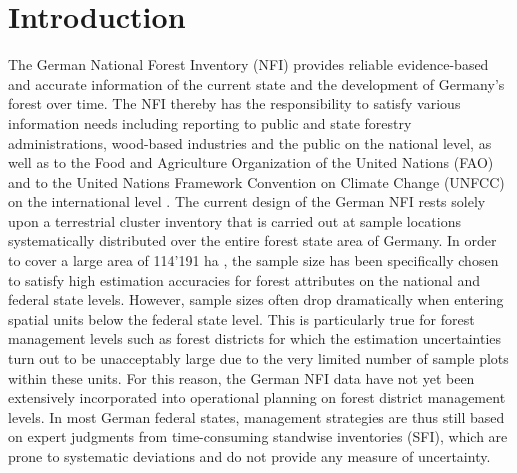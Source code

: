 
\section{Introduction} %
\label{sec:intro}

The German National Forest Inventory (NFI) provides reliable evidence-based and accurate information of the current state and the development of Germany's forest over time. The NFI thereby has the responsibility to satisfy various information needs including reporting to public and state forestry administrations, wood-based industries and the public on the national level, as well as to the Food and Agriculture Organization of the United Nations (FAO) and to the United Nations Framework Convention on Climate Change (UNFCC) on the international level \citep{polley2010intomppo}. The current design of the German NFI rests solely upon a terrestrial cluster inventory that is carried out at sample locations systematically distributed over the entire forest state area of Germany. In order to cover a large area of 114'191 ha \citep{bwi3}, the sample size has been specifically chosen to satisfy high estimation accuracies for forest attributes on the national and federal state levels. However, sample sizes often drop dramatically when entering spatial units below the federal state level. This is particularly true for forest management levels such as forest districts for which the estimation uncertainties turn out to be unacceptably large due to the very limited number of sample plots within these units. For this reason, the German NFI data have not yet been extensively incorporated into operational planning on forest district management levels. In most German federal states, management strategies are thus still based on expert judgments from time-consuming standwise inventories (SFI), which are prone to systematic deviations \cite{kulievsis2016} and do not provide any measure of uncertainty.\par

